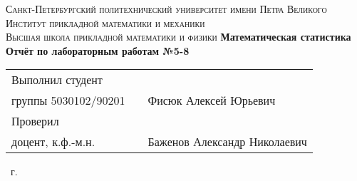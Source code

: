 \documentclass[14pt,a4paper,article]{ncc}
\begin{document}
\begin{titlepage}
    \begin{center}
        \textsc{
            Санкт-Петербургский политехнический университет имени Петра Великого \\[5mm]
            Институт прикладной математики и механики\\[2mm]
            Высшая школа прикладной математики и физики            
        }   
        \vfill
        \textbf{\large
            Математическая статистика\\
            Отчёт по лабораторным работам №5-8 \\[3mm]
        }                
    \end{center}

    \vfill
    \hfill
    \begin{tabular}{l p{140pt} l}
            Выполнил студент \\ группы 5030102/90201 && Фисюк Алексей Юрьевич
            \vspace{0.2cm}
            \\Проверил \\ доцент, к.ф.-м.н. && Баженов Александр Николаевич
    \end{tabular}
    \vfill
    \begin{center}
        \theyear\ г.
    \end{center}
\end{titlepage}

\tableofcontents
\newpage
\listoffigures
\newpage
\listoftables
\newpage

\newpage
\end{document}
